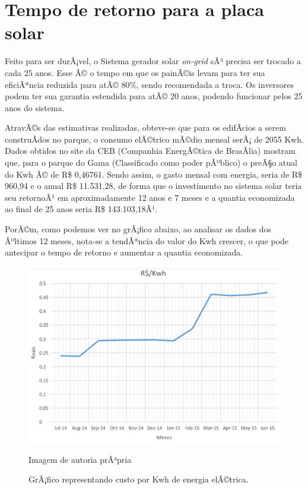 \section{Tempo de retorno para a placa solar}

Feito para ser durÃ¡vel, o Sistema gerador solar \textit{on-grid} sÃ³ precisa ser trocado a cada 25 anos. Esse Ã© o tempo em que os painÃ©is levam para ter sua eficiÃªncia reduzida para atÃ© 80\%, sendo recomendada a troca. Os inversores podem ter sua garantia estendida para atÃ© 20 anos, podendo funcionar pelos 25 anos do sistema.

AtravÃ©s das estimativas realizadas, obteve-se que para os edifÃ­cios a serem construÃ­dos no parque, o consumo elÃ©trico mÃ©dio mensal serÃ¡ de 2055 Kwh. Dados obtidos no site da CEB (Companhia EnergÃ©tica de BrasÃ­lia) mostram que, para o parque do Gama (Classificado como poder pÃºblico) o preÃ§o atual do Kwh Ã© de R\$ 0,46761. Sendo assim, o gasto mensal com energia, seria de R\$ 960,94 e o anual R\$ 11.531,28, de forma que o investimento no sistema solar teria seu retornoÂ¹ em aproximadamente 12 anos e 7 meses e a quantia economizada ao final de 25 anos seria R\$ 143.103,18Â¹.

PorÃ©m, como podemos ver no grÃ¡fico abaixo, ao analisar os dados dos Ãºltimos 12 meses, nota-se a tendÃªncia do valor do Kwh crescer, o que pode antecipar o tempo de retorno e aumentar a quantia economizada. 

\begin{figure}[H]
	\centering
	\label{GrÃ¡fico representando custo por Kwh de energia elÃ©trica.}
		\includegraphics[keepaspectratio=true,scale=0.9]{solar/4.png}
	\caption{GrÃ¡fico representando custo por Kwh de energia elÃ©trica.}
	\small{Imagem de autoria prÃ³pria}
\end{figure}

